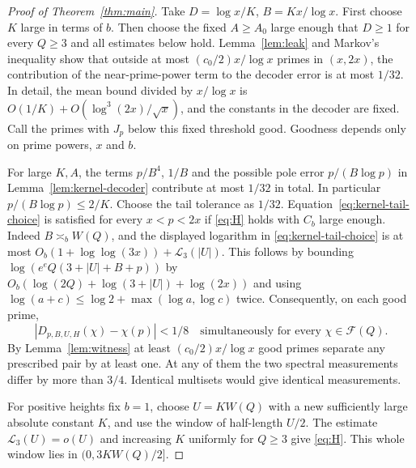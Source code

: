 \documentclass[11pt]{article}
\newcommand{\FQ}{\mathcal F(Q)}
\newcommand{\Lthree}{\mathcal L_3}
\begin{document}
\begin{proof}[Proof of Theorem~\ref{thm:main}]
Take $D=\log x/K$, $B=Kx/\log x$. First choose $K$ large in terms of $b$.
Then choose the fixed $A\ge A_0$ large enough that $D\ge1$ for every $Q\ge3$
and all estimates below hold. Lemma~\ref{lem:leak} and Markov's inequality show
that outside at most $(c_0/2)x/\log x$ primes in $(x,2x)$, the contribution
of the near-prime-power term to the decoder error is at most $1/32$.
In detail, the mean bound divided by $x/\log x$ is
$O(1/K)+O(\log^3(2x)/\sqrt{x})$, and the constants in the decoder are fixed.
Call the primes with $J_p$ below this fixed threshold good. Goodness depends
only on prime powers, $x$ and $b$.

For large $K,A$, the terms $p/B^4$, $1/B$ and the possible pole error
$p/(B\log p)$ in Lemma~\ref{lem:kernel-decoder} contribute at most $1/32$
in total. In particular $p/(B\log p)\le 2/K$. Choose the tail tolerance
as $1/32$. Equation~\eqref{eq:kernel-tail-choice} is satisfied for every
$x<p<2x$ if \eqref{eq:H} holds with $C_b$ large enough.
Indeed $B\asymp_b W(Q)$, and the displayed logarithm in
\eqref{eq:kernel-tail-choice} is at most
$O_b(1+\log\log(3x))+\Lthree(|U|)$. This follows by bounding
$\log(e^e Q(3+|U|+B+p))$ by
$O_b(\log(2Q)+\log(3+|U|)+\log(2x))$ and using
$\log(a+c)\le\log 2+\max(\log a,\log c)$ twice. Consequently,
on each good prime,
\begin{equation}\label{eq:accuracy}
 |D_{p,B,U,H}(\chi)-\chi(p)|<1/8
      \quad\text{simultaneously for every }\chi\in\FQ.
\end{equation}
By Lemma~\ref{lem:witness} at least $(c_0/2)x/\log x$ good primes
separate any prescribed pair by at least one. At any of them the two
spectral measurements differ by more than $3/4$. Identical multisets
would give identical measurements.

For positive heights fix $b=1$, choose $U=KW(Q)$ with a new sufficiently
large absolute constant $K$, and use the window of half-length $U/2$.
The estimate $\Lthree(U)=o(U)$ and increasing $K$ uniformly for $Q\ge3$
give \eqref{eq:H}. This whole window lies in $(0,3KW(Q)/2]$.
\end{proof}
\end{document}
